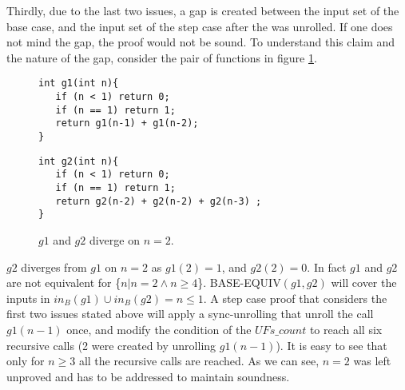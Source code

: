 Thirdly, due to the last two issues, a gap is created between the input set of the base case, and the input set of the step case after the was unrolled. If one does not mind the gap, the proof would not be sound. To understand this claim and the nature of the gap, consider the pair of functions in figure \ref{fig:g1g2neq}.
\begin{figure}[h]
\begin{center}
\begin{minipage}{7 cm}
\begin{lstlisting}
int g1(int n){
   if (n < 1) return 0;
   if (n == 1) return 1; 
   return g1(n-1) + g1(n-2);
}
\end{lstlisting}
\end{minipage}
\begin{minipage}{7 cm}
\begin{lstlisting}
int g2(int n){
   if (n < 1) return 0;
   if (n == 1) return 1; 
   return g2(n-2) + g2(n-2) + g2(n-3) ;
}
\end{lstlisting}
\end{minipage}
\caption{$g1$ and $g2$ diverge on $n=2$.}
\label{fig:g1g2neq}
\end{center}
\end{figure}
$g2$ diverges from $g1$ on $n=2$ as $g1(2) = 1$, and $g2(2) = 0$. In fact $g1$ and $g2$ are not equivalent for \{$n | n = 2 \wedge n \geq 4$\}. BASE-EQUIV$(g1,g2)$ will cover the inputs in $in_B(g1) \cup in_B(g2) = {n \leq 1}$. A step case proof that considers the first two issues stated above will apply a sync-unrolling that unroll the call $g1(n-1)$ once, and modify the condition of the $UFs\_count$ to reach all six recursive calls (2 were created by unrolling $g1(n-1)$). It is easy to see that only for $n \geq 3$ all the recursive calls are reached. As we can see, $n = 2$ was left unproved and has to be addressed to maintain soundness. 


